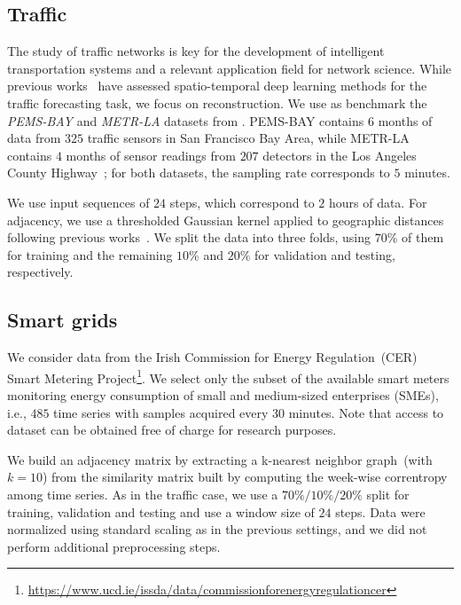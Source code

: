 \documentclass{article} \usepackage{iclr2022_conference,times}
\begin{document}
\subsection{Traffic}

The study of traffic networks is key for the development of intelligent transportation systems and a relevant application field for network science. While previous works~\citep{yu2017spatio, li2018diffusion, wu2019graph, shang2020discrete} have assessed spatio-temporal deep learning methods for the traffic forecasting task, we focus on reconstruction. We use as benchmark the \emph{PEMS-BAY} and \emph{METR-LA} datasets from \citet{li2018diffusion}. PEMS-BAY contains $6$ months of data from $325$ traffic sensors in San Francisco Bay Area, while METR-LA contains $4$ months of sensor readings from $207$ detectors in the Los Angeles County Highway~\citep{jagadish2014big}; for both datasets, the sampling rate corresponds to $5$ minutes.

We use input sequences of $24$ steps, which correspond to $2$ hours of data. For adjacency, we use a thresholded Gaussian kernel applied to geographic distances following previous works~\cite{wu2019graph}. We split the data into three folds, using $70\%$ of them for training and the remaining $10\%$ and $20\%$ for validation and testing, respectively.

\subsection{Smart grids}

We consider data from the Irish Commission for Energy Regulation~(CER) Smart Metering Project\footnote{\url{https://www.ucd.ie/issda/data/commissionforenergyregulationcer}}. We select only the subset of the available smart meters monitoring energy consumption of small and medium-sized enterprises (SMEs), i.e., $485$ time series with samples acquired every $30$ minutes. Note that access to dataset can be obtained free of charge for research purposes.

We build an adjacency matrix by extracting a k-nearest neighbor graph~(with $k=10$) from the similarity matrix built by computing the week-wise correntropy~\citep{liu2007correntropy} among time series. As in the traffic case, we use a $70\%/10\%/20\%$ split for training, validation and testing and use a window size of $24$ steps. Data were normalized using standard scaling as in the previous settings, and we did not perform additional preprocessing steps.
\end{document}
